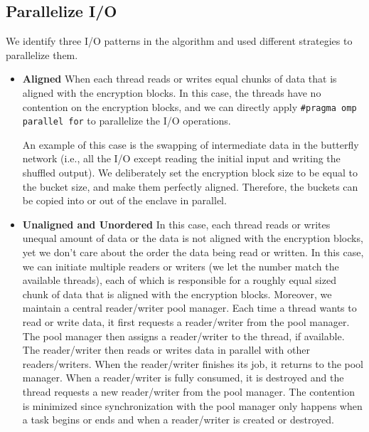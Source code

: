 \documentclass{article}
\begin{document}
\subsection{Parallelize I/O}
We identify three I/O patterns in the algorithm and used different strategies to parallelize them.
\begin{itemize}
    \item {\bf Aligned}
    When each thread reads or writes equal chunks of data that is aligned with the encryption blocks. In this case, the threads have no contention on the encryption blocks, and we can directly apply {\tt \#pragma omp parallel for} to parallelize the I/O operations.

    An example of this case is the swapping of intermediate data in the butterfly network (i.e., all the I/O except reading the initial input and writing the shuffled output). We deliberately set the encryption block size to be equal to the bucket size, and make them perfectly aligned. Therefore, the buckets can be copied into or out of the enclave in parallel.
    \item {\bf Unaligned and Unordered}
    In this case, each thread reads or writes unequal amount of data or the data is not aligned with the encryption blocks, yet we don't care about the order the data being read or written. In this case, we can initiate multiple readers or writers (we let the number match the available threads), each of which is responsible for a roughly equal sized chunk of data that is aligned with the encryption blocks. Moreover, we maintain a central reader/writer pool manager. Each time a thread wants to read or write data, it first requests a reader/writer from the pool manager. The pool manager then assigns a reader/writer to the thread, if available. The reader/writer then reads or writes data in parallel with other readers/writers. When the reader/writer finishes its job, it returns to the pool manager. When a reader/writer is fully consumed, it is destroyed and the thread requests a new reader/writer from the pool manager. The contention is minimized since synchronization with the pool manager only happens when a task begins or ends and when a reader/writer is created or destroyed.


\end{itemize}
\end{document}
